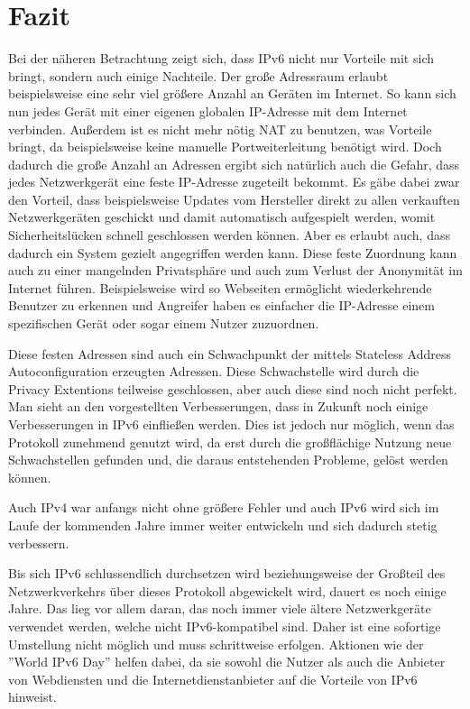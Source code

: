 \documentclass[a4paper, 12pt]{scrartcl}
\begin{document}
\newpage
\section{Fazit}
Bei der näheren Betrachtung zeigt sich, dass IPv6 nicht nur Vorteile mit sich bringt, sondern auch einige Nachteile.
Der große Adressraum erlaubt beispielsweise eine sehr viel größere Anzahl an Geräten im Internet.
So kann sich nun jedes Gerät mit einer eigenen globalen IP-Adresse mit dem Internet verbinden.
Außerdem ist es nicht mehr nötig NAT zu benutzen, was Vorteile bringt, da beispielsweise keine manuelle Portweiterleitung benötigt wird.
Doch dadurch die große Anzahl an Adressen ergibt sich natürlich auch die Gefahr, dass jedes Netzwerkgerät eine feste IP-Adresse zugeteilt bekommt. 
Es gäbe dabei zwar den Vorteil, dass beispielsweise Updates vom Hersteller direkt zu allen verkauften Netzwerkgeräten geschickt und damit automatisch aufgespielt werden, womit Sicherheitslücken schnell geschlossen werden können. Aber es erlaubt auch, dass dadurch ein System gezielt angegriffen werden kann.
Diese feste Zuordnung kann auch zu einer mangelnden Privatsphäre und auch zum Verlust der Anonymität im Internet führen.
Beispielsweise wird so Webseiten ermöglicht wiederkehrende Benutzer zu erkennen und Angreifer haben es einfacher die IP-Adresse einem spezifischen Gerät oder sogar einem Nutzer zuzuordnen.

Diese festen Adressen sind auch ein Schwachpunkt der mittels Stateless Address Autoconfiguration erzeugten Adressen.
Diese Schwachstelle wird durch die Privacy Extentions teilweise geschlossen, aber auch diese sind noch nicht perfekt.
Man sieht an den vorgestellten Verbesserungen, dass in Zukunft noch einige Verbesserungen in IPv6 einfließen werden. 
Dies ist jedoch nur möglich, wenn das Protokoll zunehmend genutzt wird, da erst durch die großflächige Nutzung neue Schwachstellen gefunden und, die daraus entstehenden Probleme, gelöst werden können.

Auch IPv4 war anfangs nicht ohne größere Fehler und auch IPv6 wird sich im Laufe der kommenden Jahre immer weiter entwickeln und sich dadurch stetig verbessern.

Bis sich IPv6 schlussendlich durchsetzen wird beziehungsweise der Großteil des Netzwerkverkehrs über dieses Protokoll abgewickelt wird, dauert es noch einige Jahre. 
Das lieg vor allem daran, das noch immer viele ältere Netzwerkgeräte verwendet werden, welche nicht IPv6-kompatibel sind.
Daher ist eine sofortige Umstellung nicht möglich und muss schrittweise erfolgen. 
Aktionen wie der ''World IPv6 Day'' helfen dabei, da sie sowohl die Nutzer als auch die Anbieter von Webdiensten und die Internetdienstanbieter auf die Vorteile von IPv6 hinweist.
\end{document}
